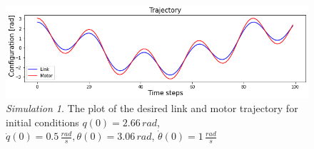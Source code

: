 \documentclass[a4paper]{article}
\begin{document}
\begin{figure}
    \centering
    \includegraphics[scale=0.7]{img/final_results/elastic/300_2/150l_175m/traj_150_175.png}
    \caption{\textit{Simulation 1}. The plot of the desired link and motor trajectory for initial conditions $q(0)=2.66\, rad$, $\dot{q}(0)=0.5\, \frac{rad}{s}, \theta(0)=3.06\, rad$, $\dot{\theta}(0)=1\, \frac{rad}{s}$}
    \label{fig:desired_elastic_150_175}
\end{figure}
\end{document}
